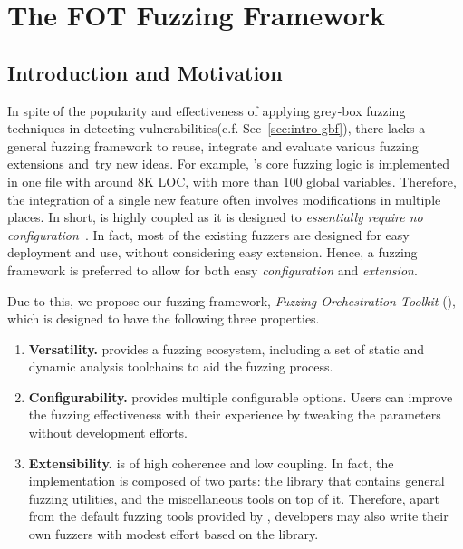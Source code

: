 
\chapter{The FOT Fuzzing Framework} \label{ch:fot}


\section{Introduction and Motivation}


In spite of the popularity and effectiveness of applying grey-box fuzzing techniques in detecting vulnerabilities(c.f. Sec~\ref{sec:intro-gbf}), there lacks a general fuzzing framework to reuse, integrate and evaluate various fuzzing extensions and~try new ideas.
For example, {\AFL}'s core fuzzing logic is implemented in one file with around 8K LOC, with more than 100 global variables. Therefore, the integration of a single new feature often involves modifications in multiple places.
In short, {\AFL} is highly coupled as it is designed to \textit{essentially require no configuration}~\cite{afl}.
In fact, most of the existing fuzzers are designed for easy deployment and use, without considering easy extension.
Hence, a fuzzing framework is preferred to allow for both easy \emph{configuration} and \emph{extension}.


Due to this, we propose our fuzzing framework, \emph{Fuzzing Orchestration Toolkit} ({\FOT}), which is designed to have the following three properties.

\begin{enumerate}[(1)]

\item  \textbf{Versatility.}
{\FOT} provides a fuzzing ecosystem, including a set of static and dynamic analysis toolchains to aid the fuzzing process.
\item \textbf{Configurability.}
{\FOT} provides multiple configurable options.	
Users can improve the fuzzing effectiveness with their experience by tweaking the parameters without development efforts.
\item \textbf{Extensibility.}
{\FOT} is of high coherence and low coupling. In fact, the implementation is composed of two parts: the library that contains general fuzzing utilities, and the miscellaneous tools on top of it. Therefore, apart from the default fuzzing tools provided by {\FOT}, developers may also write their own fuzzers with modest effort based on the library.
\end{enumerate}


